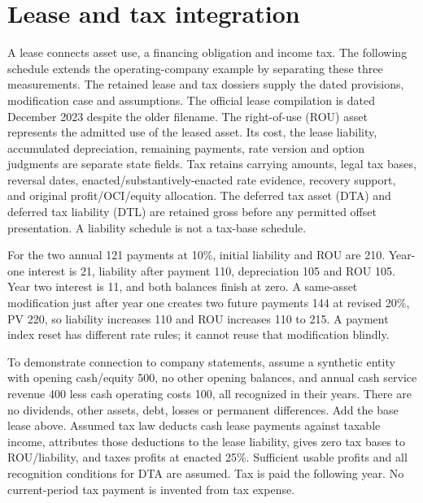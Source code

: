 

\hypertarget{lease-and-tax-integration}{%
\section{Lease and tax integration}\label{method-corporate-methods-lease-and-tax-integration}}

A lease connects asset use, a financing obligation and income tax. The following schedule extends the operating-company example by separating these three measurements. The retained lease and tax dossiers supply the dated provisions, modification case and assumptions. The official lease compilation is dated December 2023 despite the older filename. The right-of-use (ROU) asset represents the admitted use of the leased asset. Its cost, the lease liability, accumulated depreciation, remaining payments, rate version and option judgments are separate state fields. Tax retains carrying amounts, legal tax bases, reversal dates, enacted/substantively-enacted rate evidence, recovery support, and original profit/OCI/equity allocation. The deferred tax asset (DTA) and deferred tax liability (DTL) are retained gross before any permitted offset presentation. A liability schedule is not a tax-base schedule.

For the two annual 121 payments at 10\%, initial liability and ROU are 210. Year-one interest is 21, liability after payment 110, depreciation 105 and ROU 105. Year two interest is 11, and both balances finish at zero. A same-asset modification just after year one creates two future payments 144 at revised 20\%, PV 220, so liability increases 110 and ROU increases 110 to 215. A payment index reset has different rate rules; it cannot reuse that modification blindly.

To demonstrate connection to company statements, assume a synthetic entity with opening cash/equity 500, no other opening balances, and annual cash service revenue 400 less cash operating costs 100, all recognized in their years. There are no dividends, other assets, debt, losses or permanent differences. Add the base lease above. Assumed tax law deducts cash lease payments against taxable income, attributes those deductions to the lease liability, gives zero tax bases to ROU/liability, and taxes profits at enacted 25\%. Sufficient usable profits and all recognition conditions for DTA are assumed. Tax is paid the following year. No current-period tax payment is invented from tax expense.

